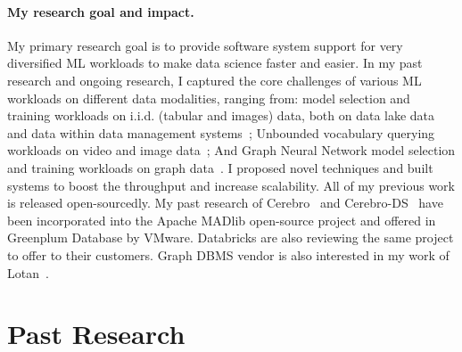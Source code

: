 \documentclass[letterpaper]{article}
\begin{document}
\paragraph{My research goal and impact.} My primary research goal is to provide software system support for very diversified ML workloads to make data science faster and easier. In my past research and ongoing research, I captured the core challenges of various ML workloads on different data modalities, ranging from: model selection and training workloads on i.i.d. (tabular and images) data, both on data lake data~\cite{cerebro} and data within data management systems~\cite{cerebro-ds}; Unbounded vocabulary querying workloads on video and image data~\cite{panorama}; And Graph Neural Network model selection and training workloads on graph data~\cite{lotan}. I proposed novel techniques and built systems to boost the throughput and increase scalability. All of my previous work is released open-sourcedly. My past research of Cerebro~\cite{cerebro} and Cerebro-DS~\cite{cerebro-ds} have been incorporated into the Apache MADlib open-source project and offered in Greenplum Database by VMware. Databricks are also reviewing the same project to offer to their customers. Graph DBMS vendor is also interested in my work of Lotan~\cite{lotan}.



%
%
%
%
%
%
%
%
%
%
%
%
\section*{Past Research}
\end{document}
